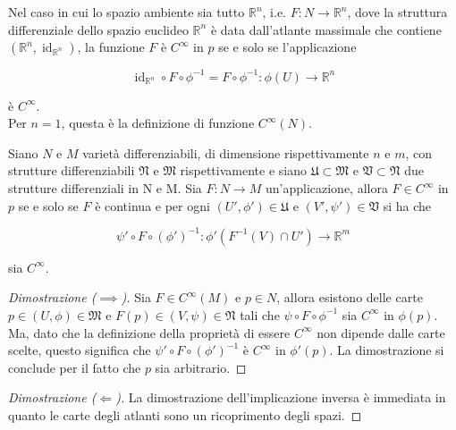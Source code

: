 \begin{remark}
	Nel caso in cui lo spazio ambiente sia tutto $ \mathbb{R}^{n} $, i.e. $ F : N \to \mathbb{R}^{n} $, dove la struttura differenziale dello spazio euclideo $ \mathbb{R}^{n} $ è data dall'atlante massimale che contiene $ (\mathbb{R}^{n},\operatorname{id}_{\mathbb{R}^{n}}) $, la funzione $ F $ è $ C^{\infty} $ in $ p $ se e solo se l'applicazione
	
	\begin{equation}
		\operatorname{id}_{\mathbb{R}^{n}} \circ F \circ \phi^{-1} = F \circ \phi^{-1} : \phi(U) \to \mathbb{R}^{n}
	\end{equation}

	è $ C^{\infty} $.\\
	Per $ n=1 $, questa è la definizione di funzione $ C^{\infty}(N) $.
\end{remark}

\begin{definition}
	Siano $ N $ e $ M $ varietà differenziabili, di dimensione rispettivamente $ n $ e $ m $, con strutture differenziabili $ \mathfrak{N} $ e $ \mathfrak{M} $ rispettivamente e siano $ \mathfrak{U} \subset \mathfrak{M} $ e $ \mathfrak{V} \subset \mathfrak{N} $ due strutture differenziali in N e M. Sia $ F : N \to M $ un'applicazione, allora $ F \in C^{\infty} $ in $ p $ se e solo se $ F $ è continua e per ogni $ (U',\phi') \in \mathfrak{U} $ e $ (V',\psi') \in \mathfrak{V} $ si ha che
	
	\begin{equation}
		\psi' \circ F \circ (\phi')^{-1} : \phi'(F^{-1}(V) \cap U') \to \mathbb{R}^{m}
	\end{equation}

	sia $ C^{\infty} $.
\end{definition}

\begin{proof}[Dimostrazione ($ \implies $)]
	Sia $ F \in C^{\infty}(M) $ e $ p \in N $, allora esistono delle carte $ p \in (U,\phi) \in \mathfrak{M} $ e $ F(p) \in (V,\psi) \in \mathfrak{N} $ tali che $ \psi \circ F \circ \phi^{-1} $ sia $ C^{\infty} $ in $ \phi(p) $. Ma, dato che la definizione della proprietà di essere $ C^{\infty} $ non dipende dalle carte scelte, questo significa che $ \psi' \circ F \circ (\phi')^{-1} $ è $ C^{\infty} $ in $ \phi'(p) $. La dimostrazione si conclude per il fatto che $ p $ sia arbitrario.
\end{proof}

\begin{proof}[Dimostrazione ($ \Longleftarrow $)]
	La dimostrazione dell'implicazione inversa è immediata in quanto le carte degli atlanti sono un ricoprimento degli spazi.
\end{proof}

